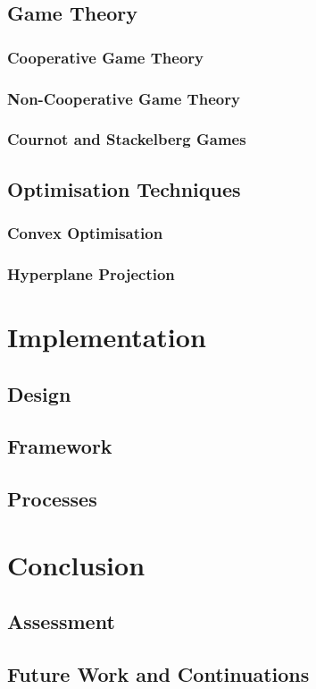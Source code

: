 \documentclass[a4paper, notitlepage]{report}
\begin{document}
\chapter{Game Theory}
\label{sec:org5768b33}
\section{Cooperative Game Theory}
\label{sec:org9a48ae0}

\section{Non-Cooperative Game Theory}
\label{sec:orgb2ad57b}

\section{Cournot and Stackelberg Games}
\label{sec:org03ef129}

\chapter{Optimisation Techniques}
\label{sec:org8a91b50}

\section{Convex Optimisation}
\label{sec:org1062a87}

\section{Hyperplane Projection}
\label{sec:org55fc455}

\part{Implementation}
\label{sec:orgf680cec}

\chapter{Design}
\label{sec:org6c5fddd}

\chapter{Framework}
\label{sec:org3e962b1}

\chapter{Processes}
\label{sec:org17cb1a7}

\part{Conclusion}
\label{sec:orgcc417e3}

\chapter{Assessment}
\label{sec:org55e638d}

\chapter{Future Work and Continuations}
\label{sec:org8768261}


\appendix
\end{document}
